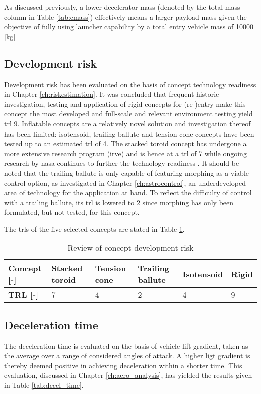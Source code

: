 As discussed previously, a lower decelerator mass (denoted by the total mass column in Table \ref{tab:cmass}) effectively means a larger payload mass given the objective of fully using launcher capability by a total entry vehicle mass of 10000 [kg]

\subsection{Development risk}
Development risk has been evaluated on the basis of concept technology readiness in Chapter \ref{ch:riskestimation}. It was concluded that frequent historic investigation, testing and application of rigid concepts for (re-)entry make this concept the most developed and full-scale and relevant environment testing yield \acrfull{trl} 9. Inflatable concepts are a relatively novel solution and investigation thereof has been limited: isotensoid, trailing ballute and tension cone concepts have been tested up to an estimated \gls{trl} of 4. The stacked toroid concept has undergone a more extensive research program (\acrfull{irve}) and is hence at a \gls{trl} of 7 while ongoing research by \gls{nasa} continues to further the technology readiness \cite{Dillman2014}. It should be noted that the trailing ballute is only capable of featuring morphing as a viable control option, as investigated in Chapter \ref{ch:astrocontrol}, an underdeveloped area of technology for the application at hand. To reflect the difficulty of control with a trailing ballute, its \gls{trl} is lowered to 2 since morphing has only been formulated, but not tested, for this concept.

The \glspl{trl} of the five selected concepts are stated in Table \ref{tab:gls_rev}.

\begin{table}[h]
\caption{Review of concept development risk}
\begin{tabular}{|l|l|l|l|l|l|}
\hline
\textbf{Concept {[}-{]}} & Stacked toroid & Tension cone & Trailing ballute & Isotensoid & Rigid \\ \hline
\textbf{TRL {[}-{]}}     &\cellcolor{green!70} 7  &\cellcolor{yellow!75}  4   &\cellcolor{red!60} 2 & \cellcolor{yellow!75}      4          &\cellcolor{green!70} 9     \\ \hline
\end{tabular}
\label{tab:gls_rev}
\end{table}

\subsection{Deceleration time}
The deceleration time is evaluated on the basis of vehicle lift gradient, taken as the average over a range of considered angles of attack. A higher ligt gradient is thereby deemed positive in achieving deceleration within a shorter time. This evaluation, discussed in Chapter \ref{ch:aero_analysis}, has yielded the results given in Table \ref{tab:decel_time}.

